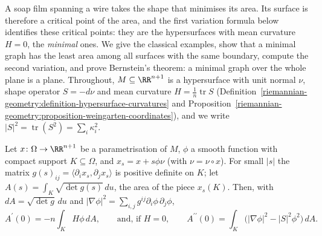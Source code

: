 A soap film spanning a wire takes the shape that minimises its area. Its surface is therefore a critical point of the area, and the first variation formula below
identifies these critical points: they are the hypersurfaces with mean curvature $H = 0$, the \emph{minimal} ones. We give the classical examples, show that a minimal
graph has the least area among all surfaces with the same boundary, compute the second variation, and prove Bernstein's theorem: a minimal graph over the whole plane is
a plane. Throughout, $M \subseteq \RR^{n+1}$ is a hypersurface with unit normal $\nu$, shape operator $S = -d\nu$ and mean curvature $H = \frac1n\operatorname{tr}S$
(Definition~\ref{riemannian-geometry:definition-hypersurface-curvatures} and Proposition~\ref{riemannian-geometry:proposition-weingarten-coordinates}), and we write
$|S|^2 = \operatorname{tr}(S^2) = \sum_i\kappa_i^2$.

\begin{proposition}\label{riemannian-geometry:proposition-variation-area}
Let $x \colon \Omega \to \RR^{n+1}$ be a parametrisation of $M$, $\phi$ a smooth function with compact support $K \subseteq \Omega$, and $x_s = x + s\phi\nu$ (with
$\nu = \nu \circ x$). For small $|s|$ the matrix $g(s)_{ij} = \langle\partial_ix_s, \partial_jx_s\rangle$ is positive definite on $K$; let
$A(s) = \int_K\sqrt{\det g(s)}\,du$, the area of the piece $x_s(K)$. Then, with $dA = \sqrt{\det g}\,du$ and $|\nabla\phi|^2 = \sum_{i,j}g^{ij}\partial_i\phi\,\partial_j\phi$,
\[
A^{\prime}(0) = -n\int_KH\phi\,dA, \qquad\text{and, if } H = 0, \qquad A^{\prime\prime}(0) = \int_K\bigl(|\nabla\phi|^2 - |S|^2\phi^2\bigr)\,dA .
\]
\end{proposition}

